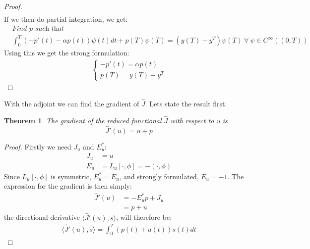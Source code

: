 \documentclass[11pt,a4paper]{article}
\newtheorem{theorem}{Theorem}
\begin{document}
\begin{proof}
\begin{align*}
\end{align*}
If we then do partial integration, we get:
\begin{align*}
&\textit{Find $p$ such that}\\
&\int_0^T(-p'(t)-\alpha p(t))\psi(t)dt +p(T)\psi(T)= (y(T)-y^T)\psi(T)\ \forall \ \psi \in C^{\infty}((0,T))
\end{align*}
Using this we get the strong formulation:
\begin{align*}
   \left\{
     \begin{array}{lr}
       -p'(t) = \alpha p(t) \\
       p(T) = y(T)-y^T
     \end{array}
   \right.
\end{align*}
\end{proof}
With the adjoint we can find the gradient of $\hat{J}$. Lets state the result first.
\begin{theorem}
The gradient of the reduced functional $\hat{J}$ with respect to u is 
$$\hat{J}'(u)=u+p$$
\end{theorem}
\begin{proof}
Firstly we need $J_u$ and $E_u^*$:
\begin{align*}
J_u &= u \\
E_u &= L_u[\cdot,\phi] = -(\cdot,\phi)
\end{align*}
Since $L_u[\cdot,\phi]$ is symmetric, $E_u^*=E_u$, and strongly formulated, $E_u=-1$. The expression for the gradient is then simply:
\begin{align*}
\hat{J}'(u)&=-E_u^*p + J_u \\
&= p+u
\end{align*} 
the directional derivative $\langle\hat{J}'(u),s\rangle$, will therefore be:
\begin{align*}
\langle\hat{J}'(u),s\rangle =\int_0^T(p(t)+u(t))s(t)dt
\end{align*}
\end{proof}
\end{document}
